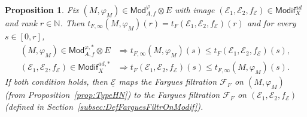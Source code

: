 \documentclass[11pt]{article}
\newtheorem{prop}[theo]{Proposition}
\theoremstyle{definition}
\numberwithin{equation}{section}
\numberwithin{figure}{section}
\numberwithin{table}{section}
\newcommand{\Mod}{\mathsf{Mod}}
\newcommand{\Modif}{\mathsf{Modif}}
\begin{document}
\begin{prop}\label{prop:SpecialSubCats}
Fix $(M,\varphi_{M})\in\Mod_{A,f}^{\varphi}\otimes E$ with image $(\mathcal{E}_{1},\mathcal{E}_{2},f_{\mathcal{E}})\in\Modif_{X}^{ad}$ and rank $r\in\mathbb{N}$. Then $t_{F,\infty}(M,\varphi_{M})(r)=t_{F}(\mathcal{E}_{1},\mathcal{E}_{2},f_{\mathcal{E}})(r)$ and for every $s\in[0,r]$,
\begin{align*}
(M,\varphi_{M})\in\Mod_{A,f}^{\varphi,\ast}\otimes E & \Longrightarrow t_{F,\infty}(M,\varphi_{M})(s)\leq t_{F}(\mathcal{E}_{1},\mathcal{E}_{2},f_{\mathcal{E}})(s),\\
(\mathcal{E}_{1},\mathcal{E}_{2},f_{\mathcal{E}})\in\Modif_{X}^{ad,\ast} & \Longrightarrow t_{F}(\mathcal{E}_{1},\mathcal{E}_{2},f_{\mathcal{E}})(s)\leq t_{F,\infty}(M,\varphi_{M})(s).
\end{align*}
If both condition holds, then $\underline{\mathcal{E}}$ maps the Fargues filtration $\mathcal{F}_{F}$ on $(M,\varphi_{M})$ (from Proposition~\ref{prop:TypeHN}) to the Fargues filtration $\mathcal{F}_{F}$ on $(\mathcal{E}_{1},\mathcal{E}_{2},f_{\mathcal{E}})$ (defined in Section~\ref{subsec:DefFarguesFiltrOnModif}).
\end{prop}
\end{document}

